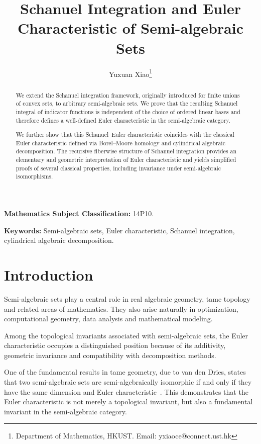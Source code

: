 \documentclass[11pt]{article}
\title{
Schanuel Integration and Euler Characteristic
of Semi-algebraic Sets
}
\author{Yuxuan Xiao\thanks{Department of Mathematics,
HKUST.
Email: yxiaoce@connect.ust.hk}
}
\date{}
\theoremstyle{remark}
\newcommand{\1}{\mathbf 1}
\begin{document}
\maketitle

\begin{abstract}

We extend the Schanuel integration framework, originally introduced for finite unions of convex sets, to arbitrary semi-algebraic sets. 
We prove that the resulting Schanuel integral of indicator functions is independent of the choice of ordered linear bases and therefore defines a well-defined Euler characteristic in the semi-algebraic category.

We further show that this Schanuel--Euler characteristic coincides with the classical Euler characteristic defined via Borel--Moore homology and cylindrical algebraic decomposition. 
The recursive fiberwise structure of Schanuel integration provides an elementary and geometric interpretation of Euler characteristic and yields simplified proofs of several classical properties, including invariance under semi-algebraic isomorphisms.

\end{abstract}

\medskip

\noindent\textbf{Mathematics Subject Classification:}
14P10.

\medskip

\noindent\textbf{Keywords:}
Semi-algebraic sets, Euler characteristic, Schanuel integration,
cylindrical algebraic decomposition.

\section{Introduction}

Semi-algebraic sets play a central role in real algebraic geometry, tame topology and related areas of mathematics. They also arise naturally in optimization, computational geometry, data analysis and mathematical modeling.

Among the topological invariants associated with semi-algebraic sets, the Euler characteristic occupies a distinguished position because of its additivity, geometric invariance and compatibility with decomposition methods.

One of the fundamental results in tame geometry, due to van den Dries, states that two semi-algebraic sets are semi-algebraically isomorphic if and only if they have the same dimension and Euler characteristic~\cite{van1998tame}. 
This demonstrates that the Euler characteristic is not merely a topological invariant, but also a fundamental invariant in the semi-algebraic category.
\end{document}
